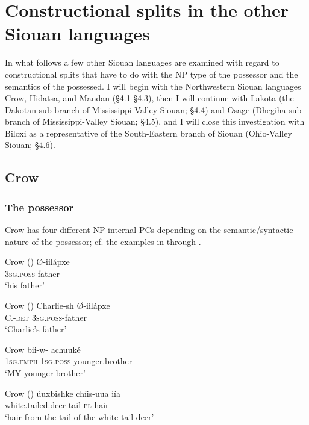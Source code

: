\documentclass[output=paper]{LSP/langsci}
\begin{document}
\section{Constructional splits in the other Siouan languages}

In what follows a few other Siouan languages are examined with regard to constructional splits that have to do with the NP type of the possessor and the semantics of the possessed. I will begin with the Northwestern Siouan languages Crow, Hidatsa, and Mandan (§4.1-§4.3), then I will continue with Lakota (the Dakotan sub-branch of Mississippi-Valley Siouan; §4.4) and Osage (Dhegiha sub-branch of Mississippi-Valley Siouan; §4.5), and I will close this investigation with Biloxi as a representative of the South-Eastern branch of Siouan (Ohio-Valley Siouan; §4.6).

\subsection{Crow}
\subsubsection{The possessor}
Crow has four different NP-internal PCs depending on the semantic/syntactic nature of the possessor; cf. the examples in  through . 

\ea Crow (\citealt[234]{Graczyk2007}) \label{crowfather}
\ex
\gll Ø-iilápxe \\
\textsc{3sg.poss}-father \\
\glt `his father'
\z
\z

\ea Crow (\citealt[234]{Graczyk2007}) \label{crowcharlie}
\ex
\gll Charlie-sh 		Ø-iilápxe \\
C.-\textsc{det}      \textsc{3sg.poss}-father \\
\glt `Charlie's father'
\z \z

\ea	Crow \citep[235]{Graczyk2007} \label{crowbrother}
\ex 
\gll bii-w- achuuké \\
\textsc{1sg.emph-1sg.poss}-younger.brother \\
\glt `MY younger brother'
\z \z

\ea Crow (\citealt[236]{Graczyk2007}) \label{crowdeer}
\ex 
\gll úuxbishke            chíis-uua iía \\
white.tailed.deer tail-\textsc{pl}      hair \\
\glt `hair from the tail of the white-tail deer'
\z \z
\end{document}
